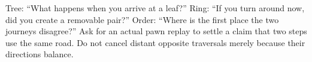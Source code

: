 Tree: ``What happens when you arrive at a leaf?'' Ring: ``If you turn around now, did you create a removable pair?'' Order: ``Where is the first place the two journeys disagree?'' Ask for an actual pawn replay to settle a claim that two steps use the same road. Do not cancel distant opposite traversals merely because their directions balance.
